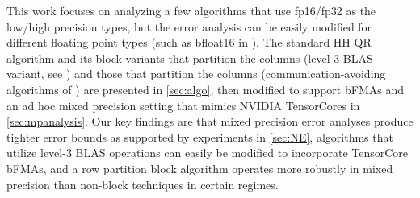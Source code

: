 \documentclass[review,onefignum,onetabnum]{siamart190516}
\begin{document}
This work focuses on analyzing a few algorithms that use fp16/fp32 as the low/high precision types, but the error analysis can be easily modified for different floating point types (such as bfloat16 in \cite{tagliavini2018floating}).
The standard HH QR algorithm and its block variants that partition the columns (level-3 BLAS variant, see \cite{golub2013matrix,Higham2002}) and those that partition the columns (communication-avoiding algorithms of \cite{Demmel2012}) are presented in \cref{sec:algo}, then modified to support bFMAs and an ad hoc mixed precision setting that mimics NVIDIA TensorCores in \cref{sec:mpanalysis}.
Our key findings are that mixed precision error analyses produce tighter error bounds as supported by experiments in \cref{sec:NE}, algorithms that utilize level-3 BLAS operations can easily be modified to incorporate TensorCore bFMAs, and a row partition block algorithm operates  more robustly in mixed precision than non-block techniques in certain regimes.
\end{document}
